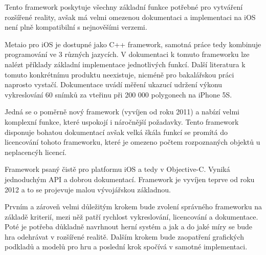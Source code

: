 \documentclass[oneside,12pt]{article}
\begin{document}
Tento framework poskytuje všechny základní funkce potřebné pro vytváření rozšířené reality, avšak má velmi omezenou dokumentaci a implementaci na iOS není plně kompatibilní s nejnověšími verzemi.

Metaio pro iOS je dostupné jako C++ framework, samotná práce tedy kombinuje programování ve 3 různých jazycích. V dokumentaci k tomuto frameworku lze nalézt příklady základní implementace jednotlivých funkcí. Další literatura k tomuto konkrétnímu produktu neexistuje, nicméně pro bakalářskou práci naprosto vystačí. Dokumentace uvádí měření ukazucí udržení výkonu vykreslování 60 snímků za vteřinu při 200 000 polygonech na iPhone 5S.

Jedná se o poměrně nový framework (vyvíjen od roku 2011) a nabízí velmi komplexní funkce, které uspokojí i náročnější požadavky. Tento framework disponuje bohatou dokumentací avšak velká škála funkcí se promítá do licencování tohoto frameworku, které je omezeno počtem rozpoznaných objektů u neplacencýh licencí.

Framework psaný čistě pro platformu iOS a tedy v Objective-C. Vyniká jednoduchým API a dobrou dokumentací. Framework je vyvíjen teprve od roku 2012 a to se projevuje malou vývojářskou základnou.

Prvním a zároveň velmi důležitým krokem bude zvolení správného frameworku na základě kriterií, mezi něž patří rychlost vykreslování, licencování a dokumentace. Poté je potřeba důkladně navrhnout herní systém a jak a do jaké míry se bude hra odehrávat v rozšířené realitě. Dalším krokem bude zaopatření grafických podkladů a modelů pro hru a poslední krok spočívá v samotné implementaci.
\end{document}
